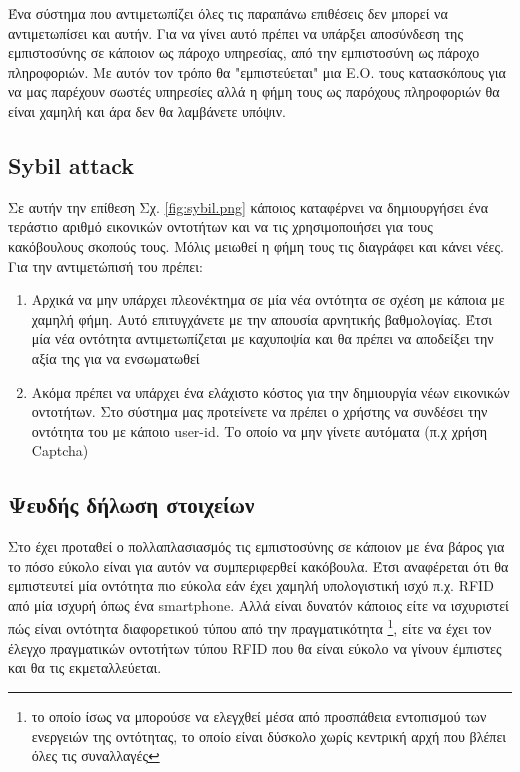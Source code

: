 Ένα σύστημα που αντιμετωπίζει όλες τις παραπάνω επιθέσεις δεν μπορεί να αντιμετωπίσει και αυτήν. Για να γίνει αυτό πρέπει να υπάρξει αποσύνδεση της εμπιστοσύνης σε κάποιον ως πάροχο υπηρεσίας, από την εμπιστοσύνη ως πάροχο πληροφοριών. Με αυτόν τον τρόπο θα "εμπιστεύεται" μια Ε.Ο. τους κατασκόπους για να μας παρέχουν σωστές υπηρεσίες αλλά η φήμη τους ως παρόχους πληροφοριών θα είναι χαμηλή και άρα δεν θα λαμβάνετε υπόψιν.


\newpage 

\subsection{Sybil attack}\label{sec:sybil}

Σε αυτήν την επίθεση  Σχ. \ref{fig:sybil.png} κάποιος καταφέρνει να δημιουργήσει ένα τεράστιο αριθμό εικονικών οντοτήτων και να τις χρησιμοποιήσει για τους κακόβουλους σκοπούς τους. Μόλις μειωθεί η φήμη τους τις διαγράφει και κάνει νέες. Για την αντιμετώπισή του πρέπει: \begin{enumerate}

\item Αρχικά να μην υπάρχει πλεονέκτημα σε μία νέα οντότητα σε σχέση με κάποια με χαμηλή φήμη. Αυτό επιτυγχάνετε με την απουσία αρνητικής βαθμολογίας. Έτσι μία νέα οντότητα αντιμετωπίζεται με καχυποψία και θα πρέπει να αποδείξει την αξία της για να ενσωματωθεί

\item Ακόμα πρέπει να υπάρχει ένα ελάχιστο κόστος για την δημιουργία νέων εικονικών οντοτήτων. Στο σύστημα μας προτείνετε να πρέπει ο χρήστης να συνδέσει την οντότητα του με κάποιο user-id. Το οποίο να μην γίνετε αυτόματα (π.χ χρήση Captcha)

\end{enumerate}


\subsection{Ψευδής δήλωση στοιχείων}

Στο \cite{Atzori} έχει προταθεί ο πολλαπλασιασμός τις εμπιστοσύνης σε κάποιον με ένα βάρος για το πόσο εύκολο είναι για αυτόν να συμπεριφερθεί κακόβουλα. Έτσι αναφέρεται ότι θα εμπιστευτεί μία οντότητα πιο εύκολα εάν έχει χαμηλή υπολογιστική ισχύ π.χ. RFID  από μία ισχυρή όπως ένα smartphone. Αλλά είναι δυνατόν κάποιος είτε να ισχυριστεί πώς είναι οντότητα διαφορετικού τύπου από την πραγματικότητα \footnote{ το οποίο ίσως να μπορούσε να ελεγχθεί μέσα από προσπάθεια εντοπισμού των ενεργειών της οντότητας, το οποίο είναι δύσκολο χωρίς κεντρική αρχή που βλέπει όλες τις συναλλαγές}, είτε να έχει τον έλεγχο πραγματικών οντοτήτων τύπου RFID που θα είναι εύκολο να γίνουν έμπιστες και θα τις εκμεταλλεύεται. 

